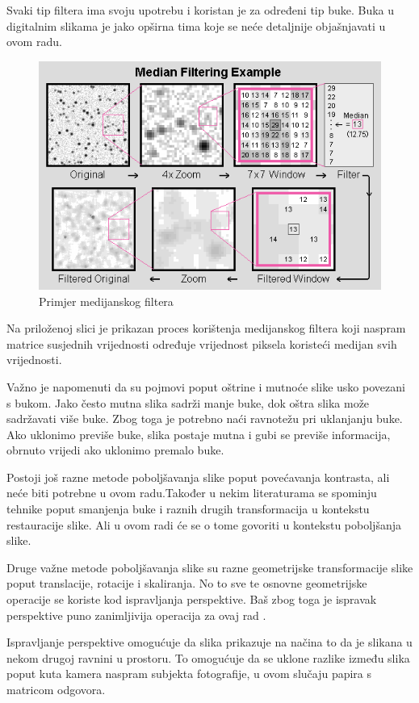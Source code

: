 \documentclass{foi}
\begin{document}
Svaki tip filtera ima svoju upotrebu i koristan je za određeni tip buke. Buka u digitalnim slikama je jako opširna tima koje se neće detaljnije objašnjavati u ovom radu.

\begin{figure}[H]
    \centering
    \includegraphics[width=0.85\linewidth]{slike/MedianFiltering.png}
    \caption{Primjer medijanskog filtera \cite{MeidanFilter}}
\end{figure}

Na priloženoj slici je prikazan proces korištenja medijanskog filtera koji naspram matrice susjednih vrijednosti određuje vrijednost piksela koristeći medijan svih vrijednosti.

Važno je napomenuti da su pojmovi poput oštrine i mutnoće  slike usko povezani s bukom. Jako često mutna slika sadrži manje buke, dok oštra slika može sadržavati više buke. Zbog toga je potrebno naći ravnotežu pri uklanjanju buke. Ako uklonimo previše buke, slika postaje mutna i gubi se previše informacija, obrnuto vrijedi ako uklonimo premalo buke.

Postoji još razne metode poboljšavanja slike poput povećavanja kontrasta, ali neće biti potrebne u ovom radu.Također u nekim literaturama se spominju tehnike poput smanjenja buke  i raznih drugih transformacija u kontekstu restauracije slike. Ali u ovom radi će se o tome govoriti u kontekstu poboljšanja slike.

Druge važne metode poboljšavanja slike su razne geometrijske transformacije slike poput translacije, rotacije i skaliranja. No to sve te osnovne geometrijske operacije se koriste kod ispravljanja perspektive. Baš zbog toga je ispravak perspektive puno zanimljivija operacija za ovaj rad \cite{GeometryTransforms}.

Ispravljanje perspektive omogućuje da slika prikazuje na načina to da je slikana u nekom drugoj ravnini u prostoru. To omogućuje da se uklone razlike između slika poput kuta kamera naspram subjekta fotografije, u ovom slučaju papira s matricom odgovora. 
\end{document}
